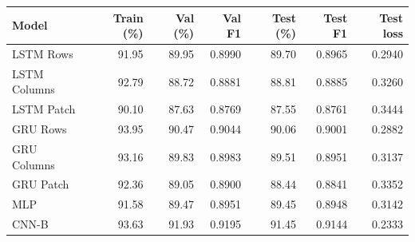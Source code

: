 \begin{tabular}{lrrrrrr}
\toprule
Model & Train (\%) & Val (\%) & Val F1 & Test (\%) & Test F1 & Test loss\\
\midrule
LSTM Rows & 91.95 & 89.95 & 0.8990 & 89.70 & 0.8965 & 0.2940\\
LSTM Columns & 92.79 & 88.72 & 0.8881 & 88.81 & 0.8885 & 0.3260\\
LSTM Patch & 90.10 & 87.63 & 0.8769 & 87.55 & 0.8761 & 0.3444\\
GRU Rows & 93.95 & 90.47 & 0.9044 & 90.06 & 0.9001 & 0.2882\\
GRU Columns & 93.16 & 89.83 & 0.8983 & 89.51 & 0.8951 & 0.3137\\
GRU Patch & 92.36 & 89.05 & 0.8900 & 88.44 & 0.8841 & 0.3352\\
MLP & 91.58 & 89.47 & 0.8951 & 89.45 & 0.8948 & 0.3142\\
CNN-B & 93.63 & 91.93 & 0.9195 & 91.45 & 0.9144 & 0.2333\\
\bottomrule
\end{tabular}
